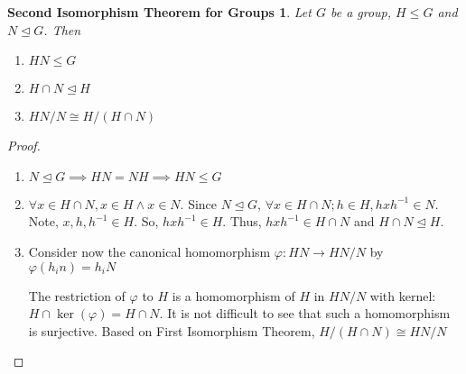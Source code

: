 \documentclass{article}
\newtheorem*{thm}{Second Isomorphism Theorem for Groups}
\theoremstyle{definition}\newtheorem{definition}{Definition}
\begin{document}
	\begin{thm}
		Let $G$ be a group, $H \leq G$ and $N \unlhd G$. Then
		\begin{enumerate}
			\item $HN \leq G$
			\item $H \cap N \unlhd H$
			\item $ HN / N \cong H / ( H \cap N )$
		\end{enumerate}
	\end{thm}
	\begin{proof}\
		\begin{enumerate}
			\item $N \unlhd G \implies HN=NH \implies HN \leq G$
			\item $\forall x \in H \cap N, x \in H \land x \in N.$ Since $N \unlhd G$, $\forall x \in H \cap N; h \in H, hxh^{-1} \in N$. Note, $x,h,h^{-1} \in H$. So, $hxh^{-1} \in H$. Thus, $hxh^{-1} \in H \cap N$ and $H \cap N \unlhd H$.
			\item Consider now the canonical homomorphism $\varphi : HN \longrightarrow HN / N$ by $\varphi(h_in)=h_iN$
			
					The restriction of $\varphi$ to $H$ is a homomorphism of $H$ in $HN / N$ with kernel: $H \cap \operatorname { ker } ( \varphi )=H \cap N $. It is not difficult to see that such a homomorphism is surjective. Based on First Isomorphism Theorem, $   H / ( H \cap N ) \cong HN / N$
		\end{enumerate}
	\end{proof}
			
\end{document}
